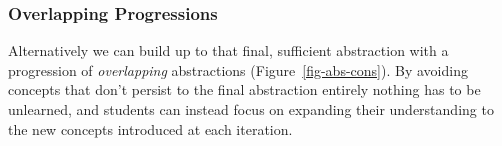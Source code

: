 \documentclass[
  letterpaper,
  DIV=11,
  numbers=noendperiod]{scrartcl}
\begin{document}
\hypertarget{overlapping-progressions}{%
\subsubsection{Overlapping
Progressions}\label{overlapping-progressions}}

Alternatively we can build up to that final, sufficient abstraction with
a progression of \emph{overlapping} abstractions
(Figure~\ref{fig-abs-cons}). By avoiding concepts that don't persist to
the final abstraction entirely nothing has to be unlearned, and students
can instead focus on expanding their understanding to the new concepts
introduced at each iteration.

\begin{figure}

\begin{minipage}[t]{0.33\linewidth}

{\centering 


}

\subcaption{\label{fig-abs-cons1}}
\end{minipage}%
%
\begin{minipage}[t]{0.33\linewidth}

{\centering 

\raisebox{-\height}{

}}
\end{minipage}
\end{figure}
\end{document}
